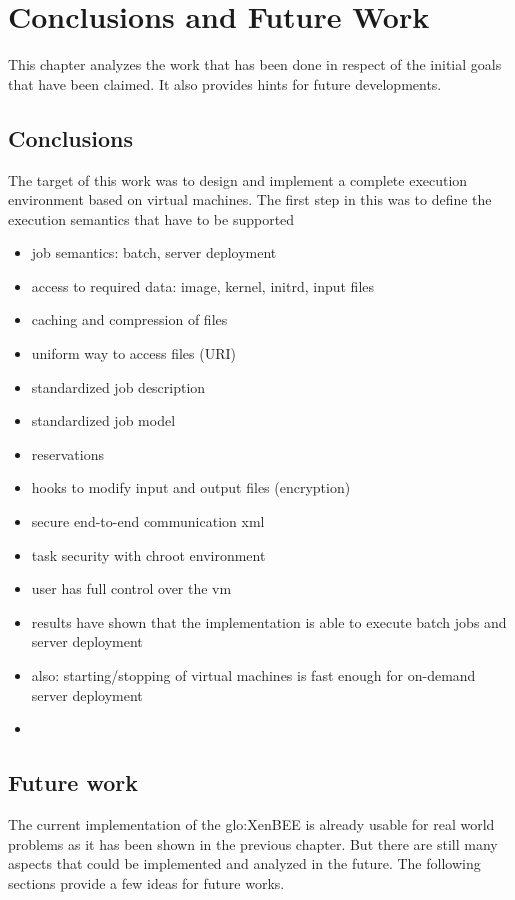 
\chapter{Conclusions and Future Work}
\label{cha:conclusions}

This  chapter analyzes  the work  that  has been  done in  respect of  the
initial goals  that have been claimed.  It also provides  hints for future
developments.

\section*{Conclusions}

The target of  this work was to design and  implement a complete execution
environment based  on virtual machines. The  first step in this was  to define the
execution semantics that have to be supported 

\begin{itemize}
\item job semantics: batch, server deployment
\item access to required data: image, kernel, initrd, input files
\item caching and compression of files
\item uniform way to access files (URI)
\item standardized job description
\item standardized job model
\item reservations
\item hooks to modify input and output files (encryption)
\item secure end-to-end communication xml
\item task security with chroot environment
\item user has full control over the vm
\item results have shown that the implementation is able to execute batch
  jobs and server deployment
\item  also: starting/stopping  of  virtual machines  is  fast enough  for
  on-demand server deployment
\item 
\end{itemize}

\section*{Future work}

The current  implementation of the \gls{glo:XenBEE} is  already usable for
real world  problems as  it has  been shown in  the previous  chapter. But
there are still many aspects that could be implemented and analyzed in the
future. The following sections provide a few ideas for future works.

